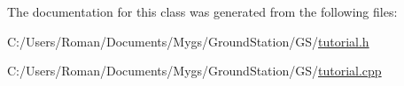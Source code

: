 The documentation for this class was generated from the following files\+:\begin{DoxyCompactItemize}
\item 
C\+:/\+Users/\+Roman/\+Documents/\+Mygs/\+Ground\+Station/\+G\+S/\hyperlink{tutorial_8h}{tutorial.\+h}\item 
C\+:/\+Users/\+Roman/\+Documents/\+Mygs/\+Ground\+Station/\+G\+S/\hyperlink{tutorial_8cpp}{tutorial.\+cpp}\end{DoxyCompactItemize}
